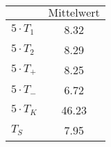 \begin{minipage}{0.49\textwidth}
 \centering
 \begin{tabular}{l S}
 \toprule
 $\text{}$ & $\text{Mittelwert}$ \\
 \midrule
${5} \cdot T_{1}$  &  8.32  \\
${5} \cdot T_{2}$  &  8.29  \\
${5} \cdot T_{+}$  &  8.25   \\
${5} \cdot T_{-}$  & 6.72  \\
${5} \cdot T_{K}$  &  46.23  \\
$T_{S}$ & 7.95 \\

 \bottomrule
 \end{tabular}
 \label{tab:mids_T_70}
  \end{minipage}
